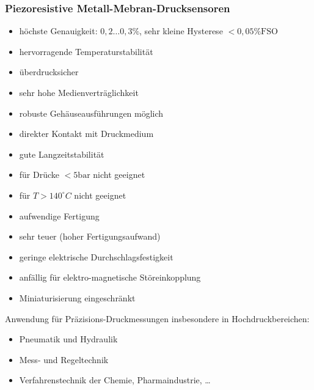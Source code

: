 \documentclass{scrreprt}
\begin{document}
\subsubsection{Piezoresistive Metall-Mebran-Drucksensoren}
\begin{itemize}[label=$+$]
\item höchste Genauigkeit: $0,2 \ldots 0,3\%$, sehr kleine Hysterese $<0,05\%\mathrm{FSO}$
\item hervorragende Temperaturstabilität
\item überdrucksicher
\item sehr hohe Medienverträglichkeit
\item robuste Gehäuseausführungen möglich
\item direkter Kontakt mit Druckmedium
\item gute Langzeitstabilität
\end{itemize}
\begin{itemize}[label=$-$]
\item für Drücke $<5\mathrm{bar}$ nicht geeignet
\item für $T > 140^\circ C$ nicht geeignet
\item aufwendige Fertigung
\item sehr teuer (hoher Fertigungsaufwand)
\item geringe elektrische Durchschlagsfestigkeit
\item anfällig für elektro-magnetische Störeinkopplung
\item Miniaturisierung eingeschränkt
\end{itemize}
Anwendung für Präzisions-Druckmessungen insbesondere in Hochdruckbereichen:
\begin{itemize}
\item Pneumatik und Hydraulik
\item Mess- und Regeltechnik
\item Verfahrenstechnik der Chemie, Pharmaindustrie, …
\end{itemize}
\end{document}
